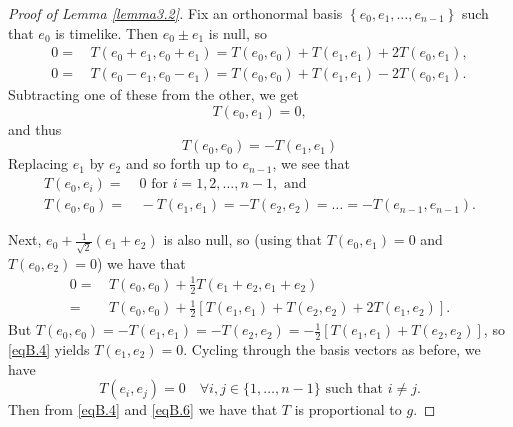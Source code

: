 \documentclass[10pt,a4paper]{amsart}
\begin{document}
\begin{proof}[Proof of Lemma \ref{lemma3.2}]
Fix an orthonormal basis $\left \{ e_0,e_1,\dots,e_{n-1}\right \}$ such that $e_0$ is timelike. Then $e_0\pm e_1$ is null, so
\begin{equation}
\label{eqB.1}
\begin{split}
0=&\, T(e_0+e_1,e_0+e_1)= T(e_0,e_0)+T(e_1,e_1)+2T(e_0,e_1),\\
0=&\, T(e_0-e_1,e_0-e_1)= T(e_0,e_0)+T(e_1,e_1)-2T(e_0,e_1).
\end{split}
\end{equation}
Subtracting one of these from the other, we get
\begin{equation}
\label{eqB.2}
T(e_0,e_1)=0,
\end{equation}
and thus
\begin{equation}
\label{eqB.3}
T(e_0,e_0)=-T(e_1,e_1)
\end{equation}
Replacing $e_1$ by $e_2$ and so forth up to $e_{n-1}$, we see that
\begin{equation}
\label{eqB.4}
\begin{split}
T(e_0,e_i)=&\, 0\text{ for }i=1,2,\dots,n-1,\text{ and }\\
T(e_0,e_0)=&\, -T(e_1,e_1)=-T(e_2,e_2)=\dots=-T(e_{n-1},e_{n-1}).
\end{split}
\end{equation}

Next, $e_0+\frac{1}{\sqrt{2}}\left ( e_1+e_2\right )$ is also null, so (using that $T(e_0,e_1)=0$ and $T(e_0,e_2)=0$) we have that
\begin{equation}
\label{eqB.5}
\begin{split}
0=&\, T(e_0,e_0)+\frac12 T(e_1+e_2,e_1+e_2)\\
=&\, T(e_0,e_0)+\frac12 \left [T(e_1,e_1)+T(e_2,e_2) +2T(e_1,e_2) \right ].
\end{split}
\end{equation}
But $T(e_0,e_0)=-T(e_1,e_1)=-T(e_2,e_2)=-\frac12 \left [ T(e_1,e_1)+T(e_2,e_2)\right ]$, so \eqref{eqB.4} yields $T(e_1,e_2)=0$. Cycling through the basis vectors as before, we have
\begin{equation}
\label{eqB.6}
T(e_i,e_j)=0\quad \forall i,j\in \{ 1,\dots,n-1\}\text{ such that }i\neq j.
\end{equation}
Then from \eqref{eqB.4} and \eqref{eqB.6} we have that $T$ is proportional to $g$.
\end{proof}
\end{document}
